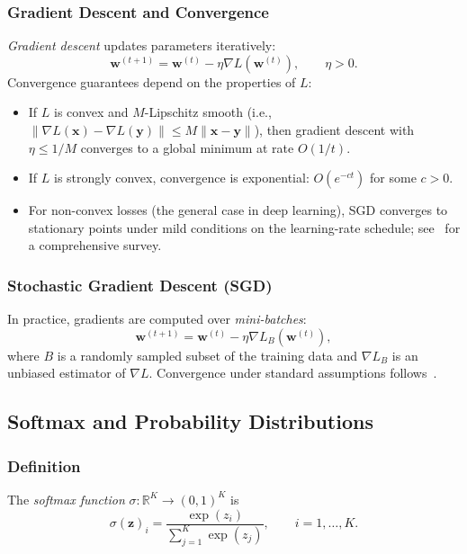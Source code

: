 \documentclass[a4paper,twocolumn,11pt]{article}
\begin{document}
\subsubsection*{Gradient Descent and Convergence}

\emph{Gradient descent} updates parameters iteratively:
\[
\mathbf{w}^{(t+1)} = \mathbf{w}^{(t)} - \eta \nabla L(\mathbf{w}^{(t)}), \qquad \eta > 0.
\]
Convergence guarantees depend on the properties of $L$:
\begin{itemize}[noitemsep]
\item If $L$ is convex and $M$-Lipschitz smooth (i.e., $\|\nabla L(\mathbf{x}) - \nabla L(\mathbf{y})\| \leq M \|\mathbf{x} - \mathbf{y}\|$), then gradient descent with $\eta \leq 1/M$ converges to a global minimum at rate $O(1/t)$.
\item If $L$ is strongly convex, convergence is exponential: $O(e^{-ct})$ for some $c > 0$.
\item For non-convex losses (the general case in deep learning), SGD converges to stationary points under mild conditions on the learning-rate schedule; see~\cite{BottouCurtis2018} for a comprehensive survey.
\end{itemize}

\subsubsection*{Stochastic Gradient Descent (SGD)}

In practice, gradients are computed over \emph{mini-batches}:
\[
\mathbf{w}^{(t+1)} = \mathbf{w}^{(t)} - \eta \nabla L_B(\mathbf{w}^{(t)}),
\]
where $B$ is a randomly sampled subset of the training data and $\nabla L_B$ is an unbiased estimator of $\nabla L$. Convergence under standard assumptions follows~\cite{RobbinsMonro1951,BottouCurtis2018}.

\subsection{Softmax and Probability Distributions}
\label{sec:A3}

\subsubsection*{Definition}

The \emph{softmax function} $\sigma : \mathbb{R}^K \to (0,1)^K$ is
\[
\sigma(\mathbf{z})_i = \frac{\exp(z_i)}{\sum_{j=1}^{K} \exp(z_j)}, \qquad i = 1, \ldots, K.
\]
\end{document}
